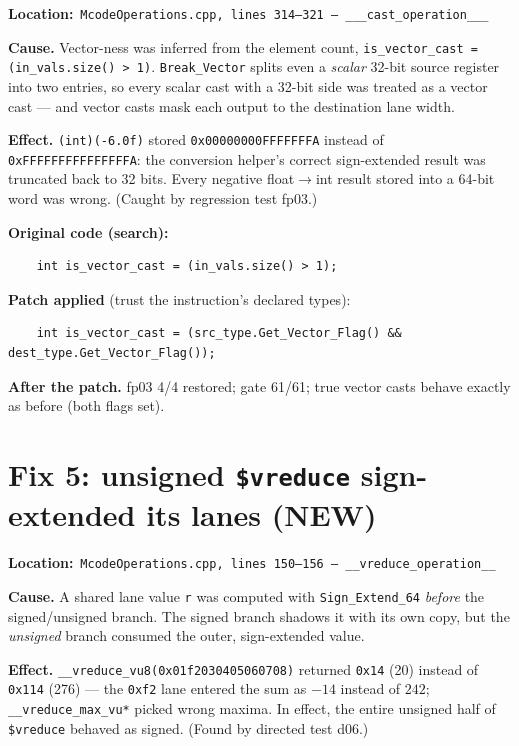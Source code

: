 \documentclass[11pt,a4paper]{report}
\newcommand{\filepath}[1]{\noindent\textbf{Location:}\ \texttt{#1}\par}
\begin{document}
\filepath{McodeOperations.cpp, lines 314--321 --- \_\_\_cast\_operation\_\_\_}

\textbf{Cause.} Vector-ness was inferred from the element count,
\texttt{is\_vector\_cast = (in\_vals.size() > 1)}. \texttt{Break\_Vector}
splits even a \emph{scalar} 32-bit source register into two entries, so
every scalar cast with a 32-bit side was treated as a vector cast --- and
vector casts mask each output to the destination lane width.

\textbf{Effect.} \texttt{(int)(-6.0f)} stored
\texttt{0x00000000FFFFFFFA} instead of \texttt{0xFFFFFFFFFFFFFFFA}: the
conversion helper's correct sign-extended result was truncated back to 32
bits. Every negative float$\to$int result stored into a 64-bit word was
wrong. (Caught by regression test fp03.)

\textbf{Original code (search):}
\begin{lstlisting}
    int is_vector_cast = (in_vals.size() > 1);
\end{lstlisting}

\textbf{Patch applied} (trust the instruction's declared types):
\begin{lstlisting}
    int is_vector_cast = (src_type.Get_Vector_Flag() && dest_type.Get_Vector_Flag());
\end{lstlisting}

\textbf{After the patch.} fp03 4/4 restored; gate 61/61; true vector casts
behave exactly as before (both flags set).

\section{Fix 5: unsigned \texttt{\$vreduce} sign-extended its lanes (NEW)}

\filepath{McodeOperations.cpp, lines 150--156 --- \_\_vreduce\_operation\_\_}

\textbf{Cause.} A shared lane value \texttt{r} was computed with
\texttt{Sign\_Extend\_64} \emph{before} the signed/unsigned branch. The
signed branch shadows it with its own copy, but the \emph{unsigned} branch
consumed the outer, sign-extended value.

\textbf{Effect.} \texttt{\_\_vreduce\_vu8(0x01f2030405060708)} returned
\texttt{0x14} (20) instead of \texttt{0x114} (276) --- the \texttt{0xf2}
lane entered the sum as $-14$ instead of $242$;
\texttt{\_\_vreduce\_max\_vu*} picked wrong maxima. In effect, the entire
unsigned half of \texttt{\$vreduce} behaved as signed. (Found by directed
test d06.)
\end{document}
